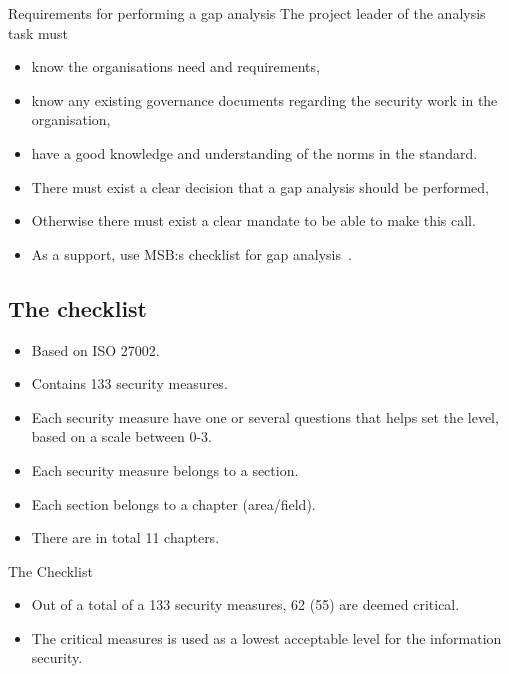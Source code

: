 \documentclass{beamer}
\begin{document}
\begin{frame}{Requirements for performing a gap analysis}
  The project leader of the analysis task must
  \begin{itemize}
    \item know the organisations need and requirements,
    \item know any existing governance documents regarding the security work in
      the organisation,
    \item have a good knowledge and understanding of the norms in the standard.
  \end{itemize}
\end{frame}

\begin{frame}
  \begin{itemize}
    \item There must exist a clear decision that a gap analysis should be
      performed,
    \item Otherwise there must exist a clear mandate to be able to make this call.
    \item As a support, use MSB:s checklist for gap analysis~\cite{MSB2011gb}.
  \end{itemize}
\end{frame}

\subsection{The checklist}

\begin{frame}
  \begin{itemize}
    \item Based on ISO 27002.
    \item Contains 133 security measures.
    \item Each security measure have one or several questions that helps set the
      level, based on a scale between 0-3.
    \item Each security measure belongs to a section.
    \item Each section belongs to a chapter (area/field).
    \item There are in total 11 chapters.
  \end{itemize}
\end{frame}

\begin{frame}{The Checklist}
  \begin{itemize}
    \item Out of a total of a 133 security measures, 62 (55) are deemed critical.
    \item The critical measures is used as a lowest acceptable level for
      the information security.
  \end{itemize}
\end{frame}
\end{document}
